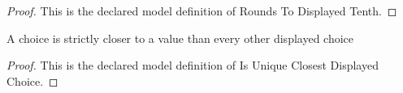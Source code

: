 \begin{proof}
  This is the declared model definition of Rounds To Displayed Tenth.
\end{proof}
\begin{definition}
  \label{def:physics:phyx-mini-0235:phyxminiproblems-problemphyxmini0235-isuniqueclosestdisplayedchoice}
  A choice is strictly closer to a value than every other displayed choice
\end{definition}
\begin{proof}
  This is the declared model definition of Is Unique Closest Displayed Choice.
\end{proof}
